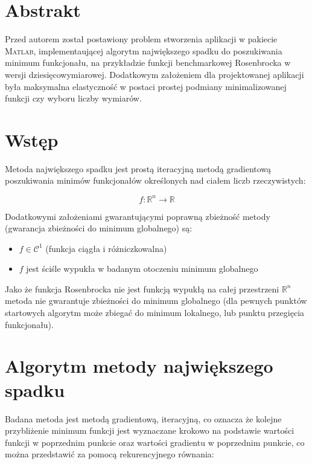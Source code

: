 \documentclass[12pt]{article}
\begin{document}
 


\section*{Abstrakt}

Przed autorem został postawiony problem stworzenia aplikacji w pakiecie
\textsc{Matlab}, implementaującej algorytm największego spadku
do poszukiwania minimum funkcjonału, na przykładzie funkcji benchmarkowej
Rosenbrocka w wersji dziesięcowymiarowej.
Dodatkowym założeniem dla projektowanej aplikacji była maksymalna elastyczność w
postaci prostej podmiany minimalizowanej funkcji czy wyboru liczby wymiarów.

\section*{Wstęp}

Metoda największego spadku jest prostą iteracyjną metodą gradientową
poszukiwania minimów funkcjonałów określonych nad ciałem liczb rzeczywistych:

\begin{equation*}
    f: \mathbb{R}^{n} \rightarrow \mathbb{R} 
\end{equation*}

Dodatkowymi założeniami gwarantującymi poprawną zbieżność metody (gwarancja
zbieżności do minimum globalnego) są:

\begin{itemize}
  \item $f \in \mathcal{C}^{1}$ (funkcja ciągła i różniczkowalna)
  \item $f$ jest ściśle wypukła w badanym otoczeniu minimum globalnego
\end{itemize}

Jako że funkcja Rosenbrocka nie jest funkcją wypukłą na całej przestrzeni
$\mathbb{R}^{n}$ metoda nie gwarantuje zbieżności do minimum globalnego (dla
pewnych punktów startowych algorytm może zbiegać do minimum lokalnego, lub
punktu przegięcia funkcjonału).

\section*{Algorytm metody największego spadku}

Badana metoda jest metodą gradientową, iteracyjną, co oznacza że kolejne
przybliżenie minimum funkcji jest wyznaczane krokowo na podstawie wartości
funkcji w poprzednim punkcie oraz wartości gradientu w poprzednim punkcie, co
można przedstawić za pomocą rekurencyjnego równania:
\end{document}
